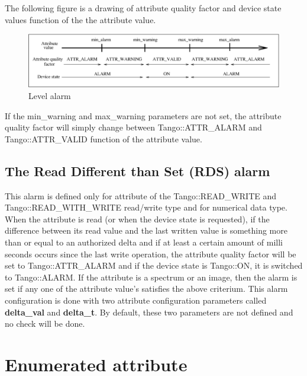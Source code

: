 The following figure is a drawing of attribute quality factor and
device state values function of the the attribute value.

\begin{figure}[H]
\begin{centering}
\includegraphics[scale=0.5]{advanced/alarm}
\par\end{centering}

\protect\caption{Level alarm\label{alarm_fig}}
\end{figure}


If the min\_warning and max\_warning parameters are not set, the attribute
quality factor will simply change between Tango::ATTR\_ALARM and Tango::ATTR\_VALID
function of the attribute value.


\subsection{The Read Different than Set (RDS) alarm}

This alarm is defined only for attribute of the Tango::READ\_WRITE
and Tango::READ\_WITH\_WRITE read/write type and for numerical data
type. When the attribute is read (or when the device state is requested),
if the difference between its read value and the last written value
is something more than or equal to an authorized delta and if at least
a certain amount of milli seconds occurs since the last write operation,
the attribute quality factor will be set to Tango::ATTR\_ALARM
and if the device state is Tango::ON, it is switched to Tango::ALARM.
If the attribute is a spectrum or an image, then the alarm is set
if any one of the attribute value's satisfies the above criterium.
This alarm configuration is done with two attribute configuration
parameters called \textbf{delta\_val} and \textbf{delta\_t}.
By default, these two parameters are not defined and no check will
be done.


\section{Enumerated attribute}

